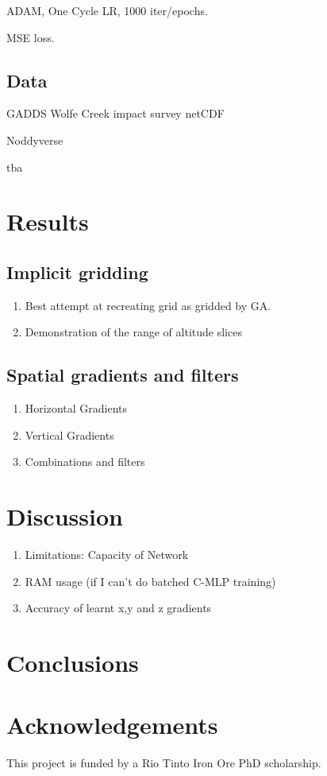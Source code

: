 \documentclass{article}
\begin{document}
ADAM, One Cycle LR, 1000 iter/epochs.

MSE loss.

\subsection{Data}
GADDS Wolfe Creek impact survey netCDF

Noddyverse

tba

\section{Results}
\subsection{Implicit gridding}
\begin{enumerate}
    \item Best attempt at recreating grid as gridded by GA.
    \item Demonstration of the range of altitude slices
\end{enumerate}

\subsection{Spatial gradients and filters}
\begin{enumerate}
    \item Horizontal Gradients
    \item Vertical Gradients
    \item Combinations and filters
\end{enumerate}

\section{Discussion}
\begin{enumerate}
    \item Limitations: Capacity of Network
    \item RAM usage (if I can't do batched C-MLP training)
    \item Accuracy of learnt x,y and z gradients
\end{enumerate}

\section{Conclusions}

\section{Acknowledgements}
This project is funded by a Rio Tinto Iron Ore PhD scholarship.

\printbibliography{}
\end{document}
